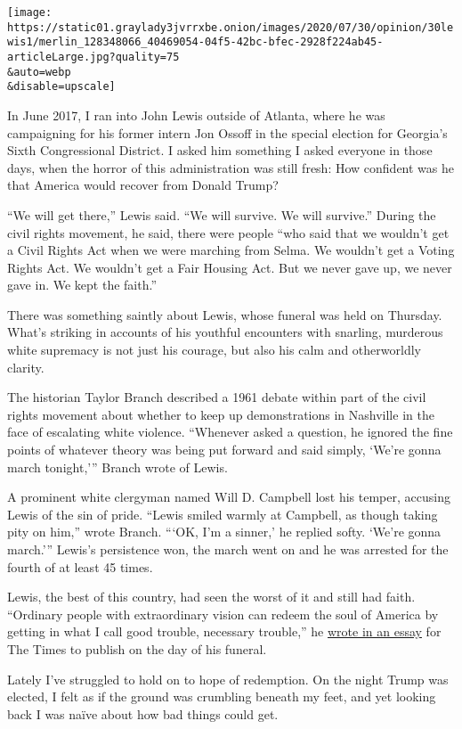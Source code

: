 \texttt{[image: https://static01.graylady3jvrrxbe.onion/images/2020/07/30/opinion/30lewis1/merlin\_128348066\_40469054-04f5-42bc-bfec-2928f224ab45-articleLarge.jpg?quality=75\\\&auto=webp\\\&disable=upscale]}

In June 2017, I ran into John Lewis outside of Atlanta, where he was
campaigning for his former intern Jon Ossoff in the special election for
Georgia's Sixth Congressional District. I asked him something I asked
everyone in those days, when the horror of this administration was still
fresh: How confident was he that America would recover from Donald
Trump?

``We will get there,'' Lewis said. ``We will survive. We will survive.''
During the civil rights movement, he said, there were people ``who said
that we wouldn't get a Civil Rights Act when we were marching from
Selma. We wouldn't get a Voting Rights Act. We wouldn't get a Fair
Housing Act. But we never gave up, we never gave in. We kept the
faith.''

There was something saintly about Lewis, whose funeral was held on
Thursday. What's striking in accounts of his youthful encounters with
snarling, murderous white supremacy is not just his courage, but also
his calm and otherworldly clarity.

The historian Taylor Branch described a 1961 debate within part of the
civil rights movement about whether to keep up demonstrations in
Nashville in the face of escalating white violence. ``Whenever asked a
question, he ignored the fine points of whatever theory was being put
forward and said simply, `We're gonna march tonight,''' Branch wrote of
Lewis.

A prominent white clergyman named Will D. Campbell lost his temper,
accusing Lewis of the sin of pride. ``Lewis smiled warmly at Campbell,
as though taking pity on him,'' wrote Branch. ```OK, I'm a sinner,' he
replied softy. `We're gonna march.''' Lewis's persistence won, the march
went on and he was arrested for the fourth of at least 45 times.

Lewis, the best of this country, had seen the worst of it and still had
faith. ``Ordinary people with extraordinary vision can redeem the soul
of America by getting in what I call good trouble, necessary trouble,''
he
\href{https://www.nytimes3xbfgragh.onion/2020/07/30/opinion/john-lewis-civil-rights-america.html}{wrote
in an essay} for The Times to publish on the day of his funeral.

Lately I've struggled to hold on to hope of redemption. On the night
Trump was elected, I felt as if the ground was crumbling beneath my
feet, and yet looking back I was naïve about how bad things could get.

